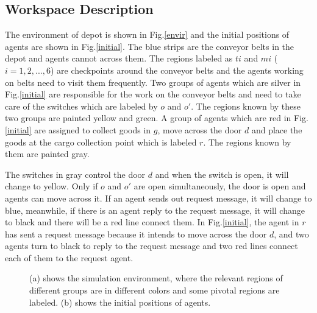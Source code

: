 \documentclass[journal]{IEEEtran}
\begin{document}
\subsection{Workspace Description}
The environment of depot is shown in Fig.\ref{envir} and the initial positions of agents are shown in Fig.\ref{initial}. The blue strips are the conveyor belts in the depot and agents cannot across them. The regions labeled as $ti$ and $mi$ ($i=1,2,...,6$) are checkpoints around the conveyor belts and the agents working on belts need to visit them frequently. Two groups of agents which are silver in Fig.\ref{initial} are responsible for the work on the conveyor belts and need to take care of the switches which are labeled by $o$ and $o'$. The regions known by these two groups are painted yellow and green. A group of agents which are red in Fig.\ref{initial} are assigned to collect goods in $g$, move across the door $d$ and place the goods at the cargo collection point which is labeled $r$. The regions known by them are painted gray.\par
The switches in gray control the door $d$ and when the switch is open, it will change to yellow. Only if $o$ and $o'$ are open simultaneously, the door is open and agents can move across it. If an agent sends out request message, it will change to blue, meanwhile, if there is an agent reply to the request message, it will change to black and there will be a red line connect them. In Fig.\ref{initial}, the agent in $r$ has sent a request message because it intends to move across the door $d$, and two agents turn to black to reply to the request message and two red lines connect each of them to the request agent.
\begin{figure}
\centering
{}
\hspace{0.3in}
\caption{(a) shows the simulation environment, where the relevant regions of different groups are in different colors and some pivotal regions are labeled. (b) shows the initial positions of agents.}
\label{first}
\end{figure}
\end{document}
